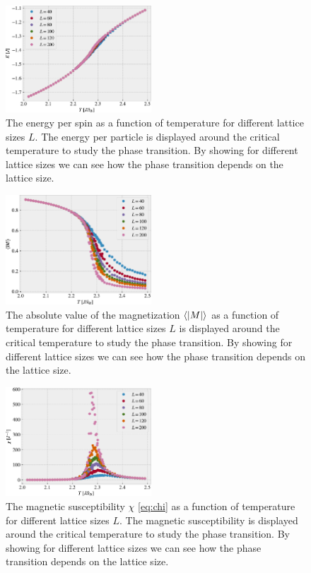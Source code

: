 \documentclass[%
 reprint,
nofootinbib,
aps,
]{revtex4-1}
\begin{document}
\begin{figure}
  \centering
  \includegraphics[width=0.485\textwidth]{../figures/energy.pdf}
  \caption{The energy per spin as a function of temperature for different lattice sizes $L$. The energy per particle is displayed around the critical temperature to study the phase transition. By showing for different lattice sizes we can see how the phase transition depends on the lattice size.}
  \label{fig:task_e_E}
\end{figure}

\begin{figure}
  \centering
  \includegraphics[width=0.485\textwidth]{../figures/magne.pdf}
  \caption{The absolute value of the magnetization $\langle \abs{M} \rangle $ as a function of temperature for different lattice sizes $L$ is displayed around the critical temperature to study the phase transition. By showing for different lattice sizes we can see how the phase transition depends on the lattice size.}
  \label{fig:task_e_absM}
\end{figure}

\begin{figure}
  \includegraphics[width=0.485\textwidth]{../figures/suscept.pdf}
  \caption{The magnetic susceptibility $\chi$ \eqref{eq:chi} as a function of temperature for different lattice sizes $L$. The magnetic susceptibility is displayed around the critical temperature to study the phase transition. By showing for different lattice sizes we can see how the phase transition depends on the lattice size.}  \label{fig:chi}
\end{figure}
\end{document}
